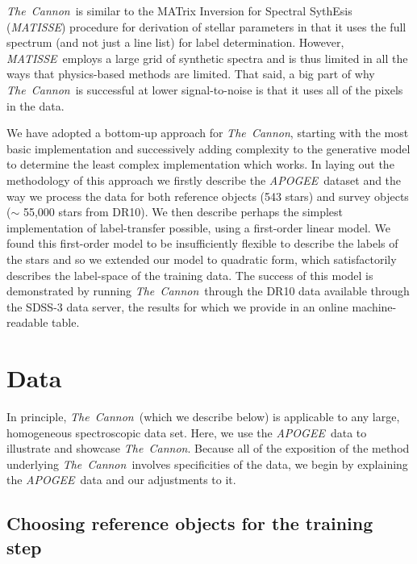 \documentclass[12pt, preprint]{aastex}
\newcommand{\tc}{\textsl{The~Cannon}}
\newcommand{\apogee}{\textsl{APOGEE}}
\newcommand{\matisse}{\textsl{MATISSE}}
\begin{document}
\tc\ is similar to the MATrix Inversion for Spectral SythEsis (\matisse) procedure
for derivation of stellar parameters \citep{RB2006} in that it uses the full spectrum
(and not just a line list) for label determination.
However, \matisse\ employs a large grid of synthetic spectra
and is thus limited in all the ways that physics-based methods are limited.
That said, a big part of why \tc\ is successful at lower signal-to-noise
is that it uses all of the pixels in the data.

We have adopted a bottom-up approach for \tc, starting with the most basic implementation and successively adding complexity to the generative model to determine the least complex implementation which works.  
In laying out the methodology of this approach we firstly describe the \apogee\ dataset and the way we process the data for both reference objects (543 stars) and survey objects ($\sim$ 55,000 stars from DR10). 
We then describe perhaps the simplest implementation of label-transfer possible, using a first-order linear model. We found this first-order model to be insufficiently flexible to describe the labels of the stars and so we extended our model to quadratic form, which satisfactorily describes the label-space of the training data.
The success of this model is demonstrated by running \tc\ through the DR10 data available through the SDSS-3 data server, the results for which we provide in an online machine-readable table. %

\section{Data}\label{sec:Data}
In principle, \tc\ (which we describe below) is applicable to any large, homogeneous spectroscopic data set.
Here, we use the \apogee\ data \citep{Ahn2014} to illustrate and showcase \tc.
Because all of the exposition of the method underlying \tc\ involves specificities of the data,
we begin by explaining the \apogee\ data and our adjustments to it.

\subsection{Choosing reference objects for the training step}
\label{sec:ReferenceObjects}
\end{document}
